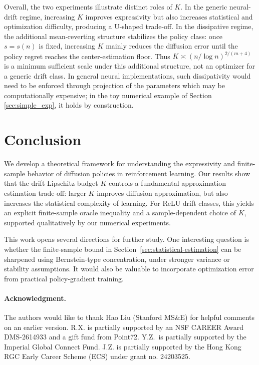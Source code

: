 \documentclass{article}
\newcommand{\1}{\mathbbm{1}}
\numberwithin{equation}{section}
\begin{document}
Overall, the two experiments illustrate distinct roles of \(K\). In the generic neural-drift regime, increasing \(K\) improves expressivity but also increases statistical and optimization difficulty, producing a U-shaped trade-off. In the dissipative regime, the additional mean-reverting structure stabilizes the policy class: once \(s=s(n)\) is fixed, increasing \(K\) mainly reduces the diffusion error until the policy regret reaches the center-estimation floor. Thus \(K\asymp (n/\log n)^{2/(m+4)}\) is a minimum sufficient scale under this additional structure, not an optimizer for a generic drift class. In general neural implementations, such dissipativity would need to be enforced through  projection of the parameters which may be computationally expensive; in the toy numerical example of Section \ref{sec:simple_exp}, it holds by construction.


\section{Conclusion}\label{sec:conclusion}
We develop a theoretical framework for understanding the expressivity and finite-sample behavior of diffusion policies in reinforcement learning. Our results show that the drift Lipschitz budget \(K\) controls a fundamental approximation--estimation trade-off: larger \(K\) improves diffusion approximation, but also increases the statistical complexity of learning. For ReLU drift classes, this yields an explicit finite-sample oracle inequality and a sample-dependent choice of \(K\), supported qualitatively by our numerical experiments.

This work opens several directions for further study. One interesting question is whether the finite-sample bound in Section~\ref{sec:statistical-estimation} can be sharpened using Bernstein-type concentration, under stronger variance or stability assumptions. It would also be valuable to  incorporate optimization error from practical policy-gradient training.

\paragraph{Acknowledgment.} The authors would like to thank Hao Liu (Stanford MS\&E) for helpful comments on an earlier version. R.X. is partially supported by an NSF CAREER Award DMS-2614933
and a gift fund from Point72. 
Y.Z.~is partially supported by the Imperial Global Connect Fund.
J.Z. is partially supported by the Hong Kong RGC Early Career Scheme (ECS) under grant no. 24203525.
\end{document}
